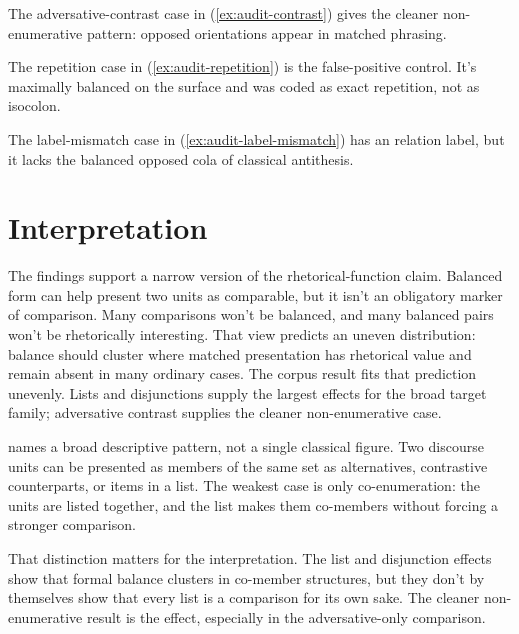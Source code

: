 \documentclass[12pt]{article}
\begin{document}
The adversative-contrast case in (\ref{ex:audit-contrast}) gives the
cleaner non-enumerative pattern: opposed orientations appear in matched
phrasing.
\ea\label{ex:audit-contrast}
\ea {}
\ex {}
\z
\z

The repetition case in (\ref{ex:audit-repetition}) is the false-positive
control. It's maximally balanced on the surface and was coded as exact
repetition, not as isocolon.
\ea\label{ex:audit-repetition}
\ea {}
\ex {}
\z
\z

The label-mismatch case in (\ref{ex:audit-label-mismatch}) has an
 relation label, but it lacks the balanced
opposed cola of classical antithesis.
\ea\label{ex:audit-label-mismatch}
\ea {}
\ex {}
\z
\z

\FloatBarrier

\section{Interpretation}

The findings support a narrow version of the rhetorical-function claim.
Balanced form can help present two units as comparable, but it isn't an
obligatory marker of comparison. Many comparisons won't be balanced, and
many balanced pairs won't be rhetorically interesting. That view predicts
an uneven distribution: balance should cluster where matched presentation
has rhetorical value and remain absent in many ordinary cases. The corpus
result fits that prediction unevenly. Lists and disjunctions supply the
largest effects for the broad target family; adversative contrast supplies
the cleaner non-enumerative case.

 names a broad descriptive pattern, not a single
classical figure. Two discourse units can be presented as members of the
same set as alternatives, contrastive counterparts, or items in a list. The
weakest case is only co-enumeration: the units are listed together, and the
list makes them co-members without forcing a stronger comparison.

That distinction matters for the interpretation. The list and disjunction
effects show that formal balance clusters in co-member structures, but they
don't by themselves show that every list is a comparison for its own sake.
The cleaner non-enumerative result is the 
effect, especially in the adversative-only comparison.
\end{document}
